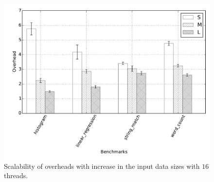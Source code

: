 
\begin{figure}[t]
\centering
\includegraphics[scale=0.42]{figure/benchmarks/worksize-times-inspector.pdf}
\caption{Scalability of overheads with increase in the input data sizes with $16$ threads. }
\label{fig:data-size-overheads}
\end{figure}
